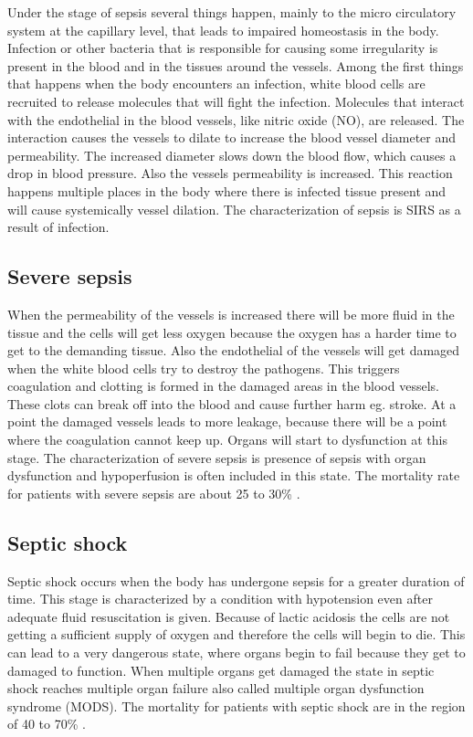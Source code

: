 Under the stage of sepsis several things happen, mainly to the micro circulatory system at the capillary level, that leads to impaired homeostasis in the body. Infection or other bacteria that is responsible for causing some irregularity is present in the blood and in the tissues around the vessels. Among the first things that happens when the body encounters an infection, white blood cells are recruited to release molecules that will fight the infection. Molecules that interact with the endothelial in the blood vessels, like nitric oxide (NO), are released. The interaction causes the vessels to dilate to increase the blood vessel diameter and permeability. The increased diameter slows down the blood flow, which causes a drop in blood pressure. Also the vessels permeability is increased. This reaction happens multiple places in the body where there is infected tissue present and will cause systemically vessel dilation. The characterization of sepsis is SIRS as a result of infection.\cite{baudouin2008,kanta2014}

\subsection{Severe sepsis}

When the permeability of the vessels is increased there will be more fluid in the tissue and the cells will get less oxygen because the oxygen has a harder time to get to the demanding tissue. Also the endothelial of the vessels will get damaged when the white blood cells try to destroy the pathogens. This triggers coagulation and clotting is formed in the damaged areas in the blood vessels. These clots can break off into the blood and cause further harm eg. stroke. At a point the damaged vessels leads to more leakage, because there will be a point where the coagulation cannot keep up. Organs will start to dysfunction at this stage. The characterization of severe sepsis is presence of sepsis with organ dysfunction and hypoperfusion is often included in this state. The mortality rate for patients with severe sepsis are about 25 to 30\% \cite{baudouin2008,kanta2014}. 

\subsection{Septic shock}

Septic shock occurs when the body has undergone sepsis for a greater duration of time. This stage is characterized by a condition with hypotension even after adequate fluid resuscitation is given. Because of lactic acidosis the cells are not getting a sufficient supply of oxygen and therefore the cells will begin to die. This can lead to a very dangerous state, where organs begin to fail because they get to damaged to function. When multiple organs get damaged the state in septic shock reaches multiple organ failure also called multiple organ dysfunction syndrome (MODS)\cite{baudouin2008,kanta2014}. The mortality for patients with septic shock are in the region of 40 to 70\% \cite{kanta2014}. 

